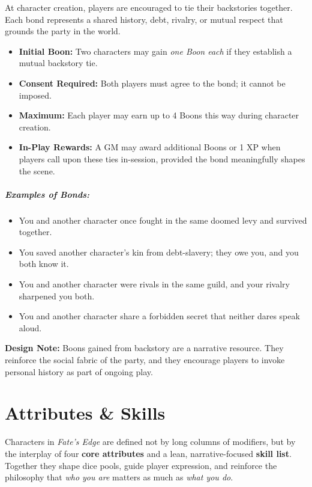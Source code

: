 \documentclass[12pt]{book}
\begin{document}
At character creation, players are encouraged to tie their backstories together.  
Each bond represents a shared history, debt, rivalry, or mutual respect that grounds the party in the world.  

\begin{itemize}
  \item \textbf{Initial Boon:} Two characters may gain \emph{one Boon each} if they establish a mutual backstory tie.  
  \item \textbf{Consent Required:} Both players must agree to the bond; it cannot be imposed.  
  \item \textbf{Maximum:} Each player may earn up to 4 Boons this way during character creation.  
  \item \textbf{In-Play Rewards:} A GM may award additional Boons or 1 XP when players call upon these ties in-session, provided the bond meaningfully shapes the scene.  
\end{itemize}

\paragraph{Examples of Bonds:}
\begin{itemize}
  \item You and another character once fought in the same doomed levy and survived together.  
  \item You saved another character’s kin from debt-slavery; they owe you, and you both know it.  
  \item You and another character were rivals in the same guild, and your rivalry sharpened you both.  
  \item You and another character share a forbidden secret that neither dares speak aloud.  
\end{itemize}

\noindent
\textbf{Design Note:} Boons gained from backstory are a narrative resource.  
They reinforce the social fabric of the party, and they encourage players to invoke personal history as part of ongoing play.

\chapter{Attributes \& Skills}

Characters in \textit{Fate’s Edge} are defined not by long columns of modifiers, but by the interplay of four \textbf{core attributes} and a lean, narrative-focused \textbf{skill list}. Together they shape dice pools, guide player expression, and reinforce the philosophy that \emph{who you are} matters as much as \emph{what you do}.
\end{document}
